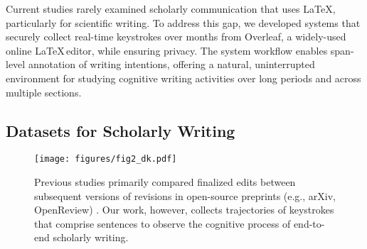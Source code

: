 Current studies rarely examined scholarly communication that uses \LaTeX, particularly for scientific writing. To address this gap, we developed systems that securely collect real-time keystrokes over months from Overleaf, a widely-used online \LaTeX $\,$editor, while ensuring privacy. The system workflow enables span-level annotation of writing intentions, offering a natural, uninterrupted environment for studying cognitive writing activities over long periods and across multiple sections.





\subsection{Datasets for Scholarly Writing} 

\begin{figure}[t!]
    \centering \hspace*{-0.3cm}
    \texttt{[image: figures/fig2\_dk.pdf]}
    \caption{Previous studies primarily compared finalized edits between subsequent versions of revisions in open-source preprints (e.g., arXiv, OpenReview) \cite{du-etal-2022-understanding-iterative, jiang-etal-2022-arxivedits, kuznetsov2022revise, darcy-etal-2024-aries}. Our work, however, collects trajectories of keystrokes that comprise sentences to observe the cognitive process of end-to-end scholarly writing.\vspace{-4mm}}
    \label{fig:comparison-previous}
\end{figure}


